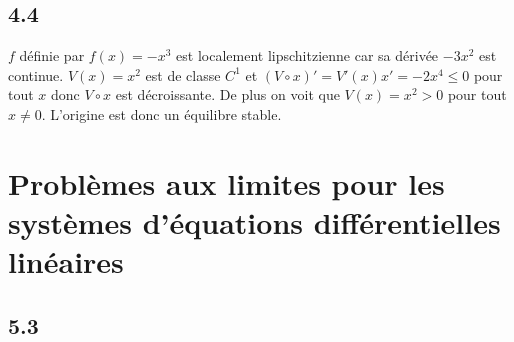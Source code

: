\documentclass{article}
\begin{document}
\subsection*{4.4}
$f$ définie par $f(x) = -x^3$ est localement lipschitzienne car sa dérivée
$-3x^2$ est continue.
$V(x) = x^2$ est de classe $C^1$ et
$(V \circ x)' = V'(x)x' = -2x^4 \leq 0$ pour tout $x$ donc $V \circ x$
est décroissante.
De plus on voit que $V(x) = x^2 > 0$ pour tout $x \neq 0$.
L'origine est donc un équilibre stable.

\section{Problèmes aux limites pour les
systèmes d'équations différentielles linéaires}

\subsection*{5.3}
\end{document}
